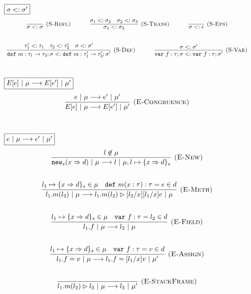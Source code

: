 \documentclass{llncs}
\newcommand{\keywadj}[1]{\mathtt{#1}}
\newcommand{\keyw}[1]{\keywadj{#1}~}
\begin{document}
$\fbox{$\sigma <: \sigma'$}$
\[
\begin{array}{c}
\infer[\textsc{(S-Refl)}]
  {\sigma <: \sigma}
  {}%
~~~~~~~~~~
\infer[\textsc{(S-Trans)}]
  {\sigma_1 <: \sigma_3}
  {\sigma_1 <: \sigma_2 & \sigma_2 <: \sigma_3}%
~~~~~~~~~~
\infer[\textsc{(S-Eps)}]
  {\sigma <: \epsilon}
  {}\\[5ex]

\infer[\textsc{(S-Def)}]
  {\keyw{def} m:\tau_1 \rightarrow \tau_2; \sigma <: \keyw{def} m:\tau_1' \rightarrow \tau_2'; \sigma'}
  {\tau_1' <: \tau_1 & \tau_2 <: \tau_2' & \sigma <: \sigma'}%
~~~~~~~~~~
\infer[\textsc{(S-Var)}]
  {\keyw{var} f:\tau; \sigma <: \keyw{var} f:\tau; \sigma'}
  {\sigma <: \sigma'}\\[5ex]  

\end{array}
\]

$\fbox{$E[e]~|~\mu \longrightarrow E[e']~|~\mu'$}$
\[
\begin{array}{c}
\infer[\textsc{(E-Congruence)}]
  {E[e]~|~\mu \longrightarrow E[e']~|~\mu'}
  {e~|~\mu \longrightarrow e'~|~\mu'}\\[5ex]  
\end{array}
\]


$\fbox{$e~|~\mu \longrightarrow e'~|~\mu'$}$
\[
\begin{array}{c}
\infer[\textsc{(E-New)}]
  {\keywadj{new}_{s}(x \Rightarrow d)~|~\mu \longrightarrow l~|~\mu, l \mapsto \{ x \Rightarrow d \}_{s}}
  {l \not\in \mu}\\[5ex]
  
\infer[\textsc{(E-Meth)}]
  {l_1.m(l_2)~|~\mu \longrightarrow l_1.m(l_2) \rhd [l_2/x][l_1/x]e~|~\mu}
  {l_1 \mapsto \{ x \Rightarrow d \}_{s} \in \mu & \keyw{def} m(x : \tau) : \tau = e \in d}\\[5ex]

\infer[\textsc{(E-Field)}]
  {l_1.f~|~\mu \longrightarrow l_2~|~\mu}
  {l_1 \mapsto \{ x \Rightarrow d \}_{s} \in \mu & \keyw{var} f:\tau = l_2 \in d}\\[5ex]

\infer[\textsc{(E-Assign)}]
  {l_1.f = v~|~\mu \longrightarrow l_1.f = [l_1/x]v~|~\mu'}
  {l_1 \mapsto \{ x \Rightarrow d \}_{s} \in \mu & \keyw{var} f:\tau = v \in d}\\[5ex]

\infer[\textsc{(E-StackFrame)}]
  {l_1.m(l_2) \rhd l_3~|~\mu \longrightarrow l_3~|~\mu'}
  {}\\[5ex]
  
\end{array}
\]
\end{document}
